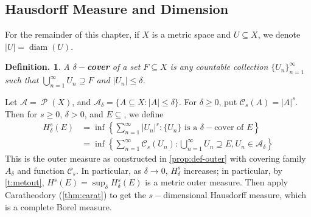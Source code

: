 \documentclass[11pt, a4paper]{memoir}
\theoremstyle{change}
\theoremstyle{plain}
\theoremstyle{nonumberplain}
\newtheorem{definition}{Definition.}
\DeclareMathOperator{\ps}{{\mathcal{P}}}
\newcommand{\defn}[1]{{\boldmath\bfseries #1}}
\DeclareMathOperator{\diam}{diam}
\numberwithin{equation}{section}
\begin{document}
\subsection{Hausdorff Measure and Dimension}
For the remainder of this chapter, if $X$ is a metric space and $U\subseteq X$, we denote $|U|=\diam(U)$.
\begin{definition}
    A \defn{$\delta-$cover} of a set $F\subseteq X$ is any countable collection $\{U_n\}_{n=1}^\infty$ such that $\bigcup_{n=1}^\infty U_n\supseteq F$ and $|U_n|\leq\delta$.
\end{definition}
Let $\mathcal{A}=\ps(X)$, and $\mathcal{A}_\delta=\{A\subseteq X:|A|\leq\delta\}$.
For $\delta\geq 0$, put $\mathcal{C}_s(A)=|A|^s$.
Then for $s\geq 0$, $\delta>0$, and $E\subseteq $, we define
\begin{align*}
    H_\delta^s(E)&=\inf\left\{\sum_{n=1}^\infty|U_n|^s:\{U_n\}\text{ is a $\delta-$cover of }E\right\}\\
                 &= \inf\left\{\sum_{n=1}^\infty\mathcal{C}_s(U_n):\bigcup_{n=1}^\infty U_n\supseteq E,U_n\in\mathcal{A}_\delta\right\}
\end{align*}
This is the outer measure as constructed in \cref{prop:def-outer} with covering family $A_\delta$ and function $\mathcal{C}_s$.
In particular, as $\delta\to 0$, $H_\delta^s$ increases; in particular, by \cref{t:metout}, $H^s(E)=\sup_\delta H_\delta^s(E)$ is a metric outer measure.
Then apply Caratheodory (\cref{thm:carat}) to get the $s-$dimensional Hausdorff measure, which is a complete Borel measure.
\end{document}
